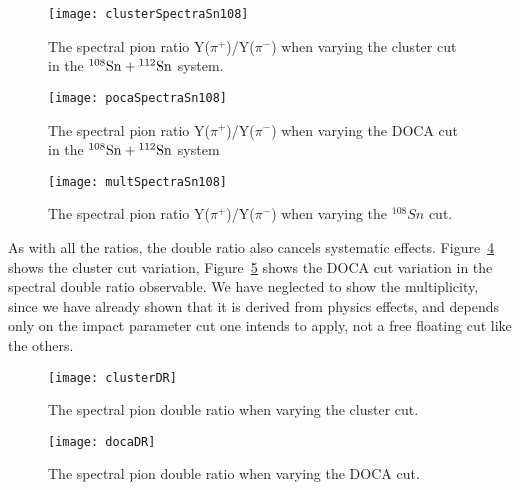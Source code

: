 \begin{figure}[!htb]
	\centering
    \texttt{[image: clusterSpectraSn108]}
	\caption{The spectral pion ratio Y($\pi^+$)/Y($\pi^-$) when varying the cluster cut in the ${}^{108}\mathrm{Sn} + {}^{112}\mathrm{Sn}$ system.}
	\label{fig:clusterSpectralSn108}
\end{figure}


\begin{figure}[!htb]
	\centering
    \texttt{[image: pocaSpectraSn108]}
	\caption{The spectral pion ratio Y($\pi^+$)/Y($\pi^-$) when varying the DOCA cut in the ${}^{108}\mathrm{Sn} + {}^{112}\mathrm{Sn}$ system}
	\label{fig:docaSpectralSn108}
\end{figure}


\begin{figure}[!htb]
	\centering
    \texttt{[image: multSpectraSn108]}
	\caption{The spectral pion ratio Y($\pi^+$)/Y($\pi^-$) when varying the ${}^{108}Sn$ cut.}
	\label{fig:multSpectralSn108}
\end{figure}



As with all the ratios, the double ratio also cancels systematic effects. Figure~\ref{fig:clusterDR} shows the cluster cut variation, Figure~\ref{fig:docaDR} shows the DOCA cut variation in the spectral double ratio observable. We have neglected to show the multiplicity, since we have already shown that it is derived from physics effects, and depends only on the impact parameter cut one intends to apply, not a free floating cut like the others. 



\begin{figure}[!htb]
	\centering
    \texttt{[image: clusterDR]}
	\caption{The spectral pion double ratio  when varying the cluster cut.}
	\label{fig:clusterDR}
\end{figure}


\begin{figure}[!htb]
	\centering
    \texttt{[image: docaDR]}
	\caption{The spectral pion double ratio when varying the DOCA cut.}
	\label{fig:docaDR}
\end{figure}





